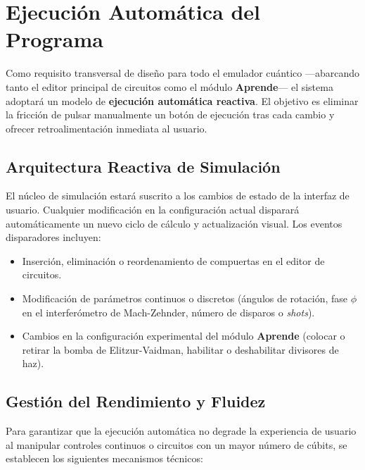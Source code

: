 \documentclass{article}
\begin{document}
\section{Ejecución Automática del Programa}

Como requisito transversal de diseño para todo el emulador cuántico —abarcando tanto el editor principal de circuitos como el módulo \textbf{Aprende}— el sistema adoptará un modelo de \textbf{ejecución automática reactiva}. El objetivo es eliminar la fricción de pulsar manualmente un botón de ejecución tras cada cambio y ofrecer retroalimentación inmediata al usuario.

\subsection{Arquitectura Reactiva de Simulación}
El núcleo de simulación estará suscrito a los cambios de estado de la interfaz de usuario. Cualquier modificación en la configuración actual disparará automáticamente un nuevo ciclo de cálculo y actualización visual. Los eventos disparadores incluyen:

\begin{itemize}
    \item Inserción, eliminación o reordenamiento de compuertas en el editor de circuitos.
    \item Modificación de parámetros continuos o discretos (ángulos de rotación, fase $\phi$ en el interferómetro de Mach-Zehnder, número de disparos o \textit{shots}).
    \item Cambios en la configuración experimental del módulo \textbf{Aprende} (colocar o retirar la bomba de Elitzur-Vaidman, habilitar o deshabilitar divisores de haz).
\end{itemize}

\subsection{Gestión del Rendimiento y Fluidez}
Para garantizar que la ejecución automática no degrade la experiencia de usuario al manipular controles continuos o circuitos con un mayor número de cúbits, se establecen los siguientes mecanismos técnicos:
\end{document}
